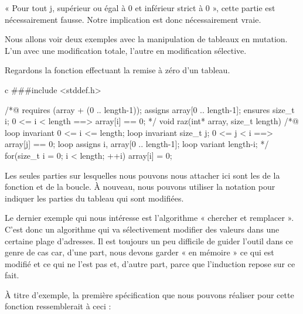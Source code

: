 « Pour tout j, supérieur ou égal à 0 et inférieur strict à 0 », cette partie est
nécessairement fausse. Notre implication est donc nécessairement vraie.





Nous allons voir deux exemples avec la manipulation de tableaux en mutation. 
L'un avec une modification totale, l'autre en modification sélective.





Regardons la fonction effectuant la remise à zéro d'un tableau.



\begin{CodeBlock}{c}
###include <stddef.h>

/*@
  requires \valid(array + (0 .. length-1));
  assigns  array[0 .. length-1];
  ensures  \forall size_t i; 0 <= i < length ==> array[i] == 0;
*/
void raz(int* array, size_t length){
  /*@
    loop invariant 0 <= i <= length;
    loop invariant \forall size_t j; 0 <= j < i ==> array[j] == 0;
    loop assigns i, array[0 .. length-1];
    loop variant length-i;
  */
  for(size_t i = 0; i < length; ++i)
    array[i] = 0;
}
\end{CodeBlock}



Les seules parties sur lesquelles nous pouvons nous attacher ici sont 
les  de la fonction et de la boucle. À nouveau, nous pouvons
utiliser la notation  pour indiquer les parties du tableau 
qui sont modifiées.





Le dernier exemple qui nous intéresse est l'algorithme « chercher et remplacer ». 
C'est donc un algorithme qui va sélectivement modifier des valeurs dans une 
certaine plage d'adresses. Il est toujours un peu difficile de guider l'outil 
dans ce genre de cas car, d'une part, nous devons garder « en mémoire » ce qui est modifié 
et ce qui ne l'est pas et, d'autre part, parce que l'induction repose sur ce fait.



À titre d'exemple, la première spécification que nous pouvons réaliser pour 
cette fonction ressemblerait à ceci :



